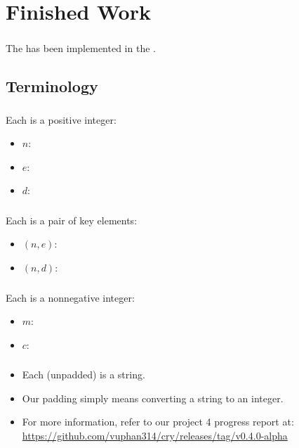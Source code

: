 \section{Finished Work}

\begin{frame}
\frametitle{}
The \cs{} \rsa{} has been implemented in the \cf{} \cry.
\end{frame}


\subsection{Terminology}

\begin{frame}
\frametitle{}
Each  is a positive integer:
\begin{itemize}
\item $n$: 
\item $e$: 
\item $d$: 
\end{itemize}
\end{frame}

\begin{frame}
\frametitle{}
Each  is a pair of key elements:
\begin{itemize}
\item $(n, e)$: 
\item $(n, d)$: 
\end{itemize}
\end{frame}

\begin{frame}
\frametitle{}
Each  is a nonnegative integer:
\begin{itemize}
\item $m$: 
\item $c$: 
\end{itemize}
\end{frame}

\begin{frame}
\frametitle{}
\begin{itemize}
\item Each (unpadded)  is a string.
\item Our padding simply means converting a string
  to an integer.
\item For more information, refer to our
  project 4 progress report at: \\
  \url{https://github.com/vuphan314/cry/releases/tag/v0.4.0-alpha}
\end{itemize}
\end{frame}

